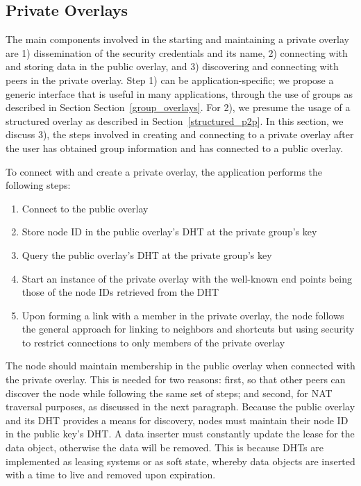 \documentclass[conference]{IEEEtran}
\begin{document}
\subsection{Private Overlays}
The main components involved in the starting and maintaining a private overlay
are 1) dissemination of the security credentials and its name, 2) connecting
with and storing data in the public overlay, and 3) discovering and connecting
with peers in the private overlay.  Step 1) can be application-specific; we
propose a generic interface that is useful in many applications, through the use of groups as described in Section
Section~\ref{group_overlays}.  For 2), we presume the usage of a structured
overlay as described in Section~\ref{structured_p2p}.  In this section, we
discuss 3), the steps involved in creating and connecting to a private overlay
after the user has obtained group information and has connected to a public
overlay.

To connect with and create a private overlay, the application performs the
following steps:
\begin{enumerate}
\setlength{\itemsep}{0pt}
\setlength{\parskip}{0pt}
\item Connect to the public overlay
\item Store node ID in the public overlay's DHT at the private group's key
\item Query the public overlay's DHT at the private group's key
\item Start an instance of the private overlay with the well-known end points
being those of the node IDs retrieved from the DHT
\item Upon forming a link with a member in the private overlay, the node follows
the general approach for linking to neighbors and shortcuts but using security to restrict connections to only members of the private overlay
\end{enumerate}

The node should maintain membership in the public overlay when connected with
the private overlay.  This is needed for two reasons: first, so that other peers can discover the
node while following the same set of steps; and second, for NAT traversal purposes, as
discussed in the next paragraph.  Because the public overlay and its DHT
provides a means for discovery, nodes must maintain their node ID in the public
key's DHT.  A data inserter must constantly update the lease for the data
object, otherwise the data will be removed.  This is because DHTs are
implemented as leasing systems or as soft state, whereby data objects are
inserted with a time to live and removed upon expiration.
\end{document}
